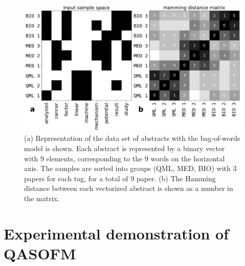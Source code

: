 \documentclass[pra,showkeys,twocolumn,showpacs]{revtex4-1}
\begin{document}
\begin{figure}[t]
	\includegraphics[width=0.95\columnwidth]{vectorized_sample.png}
	\caption{
		(a) Representation of the data set of abstracts with the bag-of-words model is shown. 
		Each abstract is represented by a binary vector with 9 elements, corresponding to the 9 words on the horizontal axis. 
		The samples are sorted into groups (QML, MED, BIO) with 3 papers for each tag, for a total of 9 paper.    
		(b) The Hamming distance between each vectorized abstract is shown as a number in the matrix. 
	} 
	\label{fig:vectorized_sample}
\end{figure}



















\section{Experimental demonstration of QASOFM}
\end{document}
